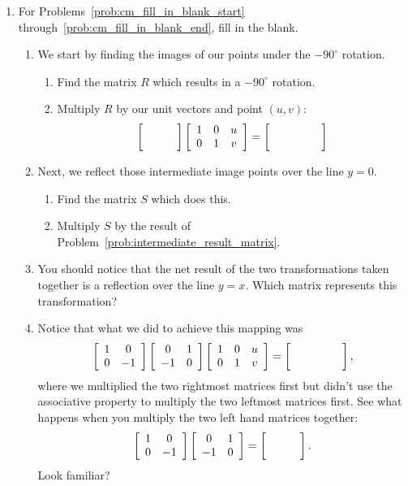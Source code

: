 \documentclass[../gatm.tex]{subfiles}
\begin{document}
\begin{enumerate}
\item For Problems~\ref{prob:cm_fill_in_blank_start} through~\ref{prob:cm_fill_in_blank_end}, fill in the blank.
\begin{enumerate}
\item We start by finding the images of our points under the $-90^\circ$ rotation. \label{prob:cm_fill_in_blank_start}
\begin{enumerate}
\item Find the matrix $R$ which results in a $-90^\circ$ rotation.
\item  \label{prob:intermediate_result_matrix} Multiply $R$ by our unit vectors and point $(u,v)$: $$\blanktwomat\left[\begin{array}{ccc} 1 & 0 & u \\ 0 & 1 & v \end{array}\right] = \left[\phantom{\begin{array}{ccc} 1 & 0 & u \\ 0 & 1 & v \end{array}}\right]$$
\end{enumerate}
\item Next, we reflect those intermediate image points over the line $y=0$.
\begin{enumerate}
\item Find the matrix $S$ which does this.
\item Multiply $S$ by the result of Problem~\ref{prob:intermediate_result_matrix}.
\end{enumerate}
\item You should notice that the net result of the two transformations taken together is a reflection over the line $y=x$. Which matrix represents this transformation?
\item Notice that what we did to achieve this mapping was $$\twomat{1}{0}{0}{-1}\twomat{0}{1}{-1}{0}\left[\begin{array}{ccc} 1 & 0 & u \\ 0 & 1 & v \end{array}\right]=\left[\phantom{\begin{array}{ccc} 1 & 0 & u \\ 0 & 1 & v \end{array}}\right],$$
where we multiplied the two rightmost matrices first but didn't use the associative property to multiply the two leftmost matrices first. See what happens when you multiply the two left hand matrices together: $$\twomat{1}{0}{0}{-1}\twomat{0}{1}{-1}{0}=\blanktwomat.$$ Look familiar?

\end{enumerate}
\end{enumerate}
\end{document}
